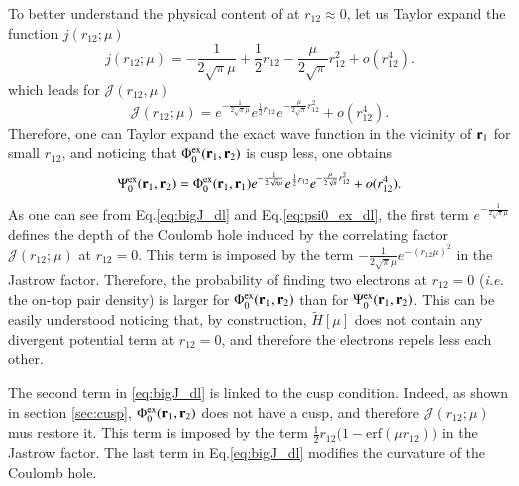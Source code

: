 \documentclass[aip,jcp,reprint,noshowkeys,superscriptaddress]{revtex4-1}
\newcommand{\br}[0]{{\bf {r}}}
\newcommand{\psiex}[0]{\Psi^{\text{ex}}_0}
\newcommand{\phiex}[0]{\Phi^{\text{ex}}_0}
\begin{document}
To better understand the physical content of at $r_{12}\approx 0$,  
let us Taylor expand the function $j(r_{12};\mu)$ 
\begin{equation}
 \label{eq:j_dl}
 j(r_{12};\mu) = -\frac{1}{2\sqrt{\pi}\mu} + \frac{1}{2}r_{12} - \frac{\mu}{2\sqrt{\pi}} r_{12}^2 + o(r_{12}^4).
\end{equation}
which leads for $\mathcal{J}(r_{12},\mu)$
\begin{equation}
 \label{eq:bigJ_dl}
 \mathcal{J}(r_{12};\mu) = e^{-\frac{1}{2\sqrt{\pi}\mu}} e^{ \frac{1}{2}r_{12}} e^{- \frac{\mu}{2\sqrt{\pi}} r_{12}^2} + o(r_{12}^4) .
\end{equation}
Therefore, one can Taylor expand the exact wave function in the vicinity of $\br{}_1$ for small $r_{12}$, and noticing that $\phiex(\br{}_1,\br{}_2) $ is cusp less, one obtains 
\begin{equation}
 \label{eq:psi0_ex_dl}
 \psiex(\br{}_1,\br{}_2) = \phiex(\br{}_1,\br{}_1)e^{-\frac{1}{2\sqrt{\pi}\mu}} e^{ \frac{1}{2}r_{12}} e^{- \frac{\mu}{2\sqrt{\pi}} r_{12}^2} + o(r_{12}^4) .
\end{equation}
As one can see from Eq.\eqref{eq:bigJ_dl} and Eq.\eqref{eq:psi0_ex_dl}, the first term $e^{-\frac{1}{2\sqrt{\pi}\mu}}$ defines the depth of the Coulomb hole induced by the correlating factor $\mathcal{J}(r_{12};\mu)$ at $r_{12}=0$. 
This term is imposed by the term $- \frac{1}{2\sqrt{\pi}\mu}e^{-(r_{12}\mu)^2}$ in the Jastrow factor. 
Therefore, the probability of finding two electrons at $r_{12}=0$ (\textit{i.e.} the on-top pair density) is larger for $\phiex(\br{}_1,\br{}_2)$ than for $\psiex(\br{}_1,\br{}_2)$.  
This can be easily understood noticing that, by construction, $\tilde{H}[\mu]$ does not contain any divergent potential term at $r_{12}=0$, and therefore the electrons repels less each other.  

The second term in \eqref{eq:bigJ_dl} is linked to the cusp condition. 
Indeed, as shown in section \ref{sec:cusp}, $\phiex(\br{}_1,\br{}_2)$ does not have a cusp, and therefore $\mathcal{J}(r_{12};\mu)$ mus restore it. This term is imposed by the term $\frac{1}{2}r_{12}\bigg( 1 - \text{erf}(\mu r_{12})  \bigg)$ in the Jastrow factor. 
The last term in Eq.\eqref{eq:bigJ_dl} modifies the curvature of the Coulomb hole. 
\end{document}
